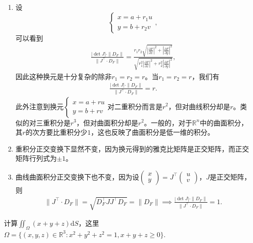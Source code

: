 \documentclass[../../main.tex]{subfiles}%
\begin{document}
\begin{remark}
\begin{enumerate}[(1)]
\item 设
\[
\begin{cases}
x=a+r_1 u\\
y=b+r_2 v
\end{cases},
\]
可以看到
\begin{align*}
\frac{|\det J|\cdot\|D_F\|}{\|J^\top\cdot D_F\|}=\frac{r_1 r_2\sqrt{\left|\frac{\partial F}{\partial x}\right|^2+\left|\frac{\partial F}{\partial y}\right|^2}}{\sqrt{r_1^2\left|\frac{\partial F}{\partial x}\right|^2+r_2^2\left|\frac{\partial F}{\partial y}\right|^2}},
\end{align*}
因此这种换元是十分复杂的除非$r_1=r_2=r$。当$r_1=r_2=r$，我们有
\begin{align*}
\frac{|\det J|\cdot\|D_F\|}{\|J^\top\cdot D_F\|}=r.
\end{align*}
此外注意到换元$\begin{cases}x=a+ru\\y=b+rv\end{cases}$对二重积分而言是$r^2$，但对曲线积分却是$r$。类似的对三重积分是$r^3$，但对曲面积分却是$r^2$。一般的，对于$\mathbb{R}^n$中的曲面积分，其$r$的次方要比重积分少$1$，这也反映了曲面积分是低一维的积分。

\item 重积分正交变换下显然不变，因为换元得到的雅克比矩阵是正交矩阵，而正交矩阵行列式为$\pm1$。

\item 曲线曲面积分正交变换下也不变，因为设$\begin{pmatrix}x\\y\end{pmatrix}=J^\top\begin{pmatrix}u\\v\end{pmatrix}$，$J$是正交矩阵，则
\begin{align*}
\|J^\top\cdot D_F\|=\sqrt{D_F^\top JJ^\top D_F}=\|D_F\| \implies \frac{|\det J|\cdot\|D_F\|}{\|J^\top\cdot D_F\|}=1.
\end{align*}
\end{enumerate}
\end{remark}

\begin{example}
计算$\iint_{\Omega}(x+y+z)\mathrm{d}S$，这里$\Omega=\{(x,y,z)\in\mathbb{R}^3:x^2+y^2+z^2=1,x+y+z\geqslant0\}$.
\end{example}
\end{document}
